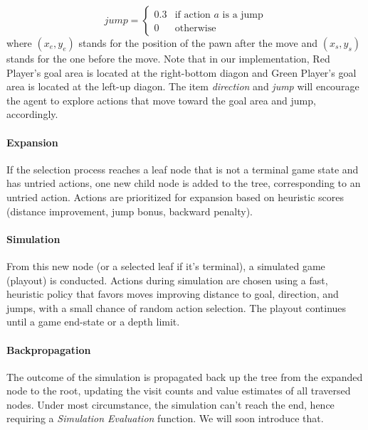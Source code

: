 \begin{equation}
jump=
\begin{cases} 
0.3 & \text{if action } a \text{ is a jump} \\
0 & \text{otherwise}
\end{cases} 
\end{equation}
where $(x_e, y_e)$ stands for the position of the pawn after the move and $(x_s, y_s)$ stands for the one before the move. Note that in our implementation, Red Player's goal area is located at the right-bottom diagon and Green Player's goal area is located at the left-up diagon. The item \textit{direction} and \textit{jump} will encourage the agent to explore actions that move toward the goal area and jump, accordingly. 

\paragraph{Expansion}
If the selection process reaches a leaf node that is not a terminal game state and has untried actions, one new child node is added to the tree, corresponding to an untried action. Actions are prioritized for expansion based on heuristic scores (distance improvement, jump bonus, backward penalty).

\paragraph{Simulation}
From this new node (or a selected leaf if it's terminal), a simulated game (playout) is conducted. Actions during simulation are chosen using a fast, heuristic policy that favors moves improving distance to goal, direction, and jumps, with a small chance of random action selection. The playout continues until a game end-state or a depth limit.

\paragraph{Backpropagation}
The outcome of the simulation is propagated back up the tree from the expanded node to the root, updating the visit counts and value estimates of all traversed nodes. Under most circumstance, the simulation can't reach the end, hence requiring a \textit{Simulation Evaluation} function. We will soon introduce that. 

